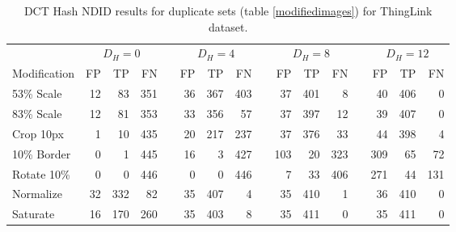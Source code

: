 \documentclass[english,12pt,a4paper,pdftex,elec,utf8]{aaltothesis}
\begin{document}
\begin{table}[htb]\footnotesize
\caption{ DCT Hash NDID results for duplicate sets (table \ref{modifiedimages}) for ThingLink dataset. }
\label{dctresults}
\begin{center}
  \setlength\tabcolsep{3pt} %
  \begin{tabular}{@{}lrrrrrrrrrrrrrrr@{}}
    \toprule
    & \multicolumn{3}{c}{$D_H = 0$} &\phantom{abc} &\multicolumn{3}{c}{$D_H = 4$} &\phantom{abc} & \multicolumn{3}{c}{$D_H=8$} &\phantom{abc} & \multicolumn{3}{c}{$D_H=12$}\\
\cmidrule{2-4} \cmidrule{6-8} \cmidrule{10-12} \cmidrule{14-16}
    Modification & FP & TP & FN &\phantom{abc} & FP & TP & FN &\phantom{abc} & FP & TP & FN &\phantom{abc} & FP & TP & FN\\ \midrule
    53\% Scale   & 12 & 83 & 351 &\phantom{abc} & 36 & 367 & 403 &\phantom{abc} & 37 & 401 & 8 &\phantom{abc} & 40 & 406 & 0\\
    83\% Scale   & 12 & 81 & 353 &\phantom{abc} & 33 & 356 & 57 &\phantom{abc} & 37 & 397 & 12 &\phantom{abc} & 39 & 407 & 0\\
    Crop 10px    & 1 & 10 & 435 &\phantom{abc} & 20 & 217 & 237 &\phantom{abc} & 37 & 376 & 33 &\phantom{abc} & 44 & 398 & 4\\
    10\% Border  & 0 & 1 & 445 & \phantom{abc} & 16 & 3 & 427 &\phantom{abc} & 103 & 20 & 323&\phantom{abc} & 309 & 65 & 72\\
    Rotate 10\%  & 0 & 0 & 446 &\phantom{abc} & 0 & 0 & 446 &\phantom{abc} & 7 & 33 & 406 &\phantom{abc} & 271 & 44 & 131\\
    Normalize    & 32 & 332 & 82 &\phantom{abc} & 35 & 407 & 4 &\phantom{abc} & 35 & 410 & 1 &\phantom{abc} & 36 & 410 & 0\\
    Saturate     & 16 & 170 & 260 &\phantom{abc} & 35  & 403 & 8 &\phantom{abc} & 35 & 411 & 0 &\phantom{abc} & 35 & 411 & 0\\
    \bottomrule
\end{tabular}
\end{center}
\end{table}
\end{document}
